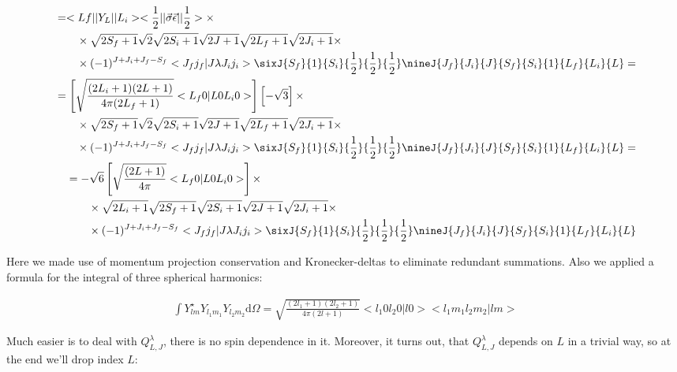 \begin{align}
    \begin{split}
        &= <Lf|| Y_L ||L_i> <\frac{1}{2}|| \vec{\sigma}\vec{\epsilon} ||\frac{1}{2}> \times \\
        &\qquad\times \sqrt{2S_f+1} \sqrt{2} \sqrt{2S_i + 1} \sqrt{2J+1} \sqrt{2L_f+1} \sqrt{2J_i+1} \times \\
        &\qquad\times (-1)^{J + J_i + J_f - S_f} <J_f j_f| J \lambda J_i j_i> \sixJ{S_f}{1}{S_i}{\frac{1}{2}}{\frac{1}{2}}{\frac{1}{2}} \nineJ{J_f}{J_i}{J}{S_f}{S_i}{1}{L_f}{L_i}{L} =
    \end{split}\\
    \begin{split}
        &= \left[ \sqrt{\frac{(2L_i+1)(2L+1)}{4\pi (2L_f+1)}} <L_f 0 | L 0 L_i 0> \right] \left[ -\sqrt{3} \right] \times \\
        &\qquad\times \sqrt{2S_f+1} \sqrt{2} \sqrt{2S_i + 1} \sqrt{2J+1} \sqrt{2L_f+1} \sqrt{2J_i+1} \times \\
        &\qquad\times (-1)^{J + J_i + J_f - S_f} <J_f j_f| J \lambda J_i j_i> \sixJ{S_f}{1}{S_i}{\frac{1}{2}}{\frac{1}{2}}{\frac{1}{2}} \nineJ{J_f}{J_i}{J}{S_f}{S_i}{1}{L_f}{L_i}{L} =
    \end{split}\\
    \begin{split}
        &= -\sqrt{6} \left[ \sqrt{\frac{(2L+1)}{4\pi}} <L_f 0 | L 0 L_i 0> \right] \times \\
        &\qquad\times \sqrt{2L_i+1} \sqrt{2S_f+1} \sqrt{2S_i + 1} \sqrt{2J+1} \sqrt{2J_i+1} \times \\
        &\qquad\times (-1)^{J + J_i + J_f - S_f} <J_f j_f| J \lambda J_i j_i> \sixJ{S_f}{1}{S_i}{\frac{1}{2}}{\frac{1}{2}}{\frac{1}{2}} \nineJ{J_f}{J_i}{J}{S_f}{S_i}{1}{L_f}{L_i}{L}
    \end{split}
\end{align}

Here we made use of momentum projection conservation and Kronecker-deltas to eliminate redundant summations. Also we applied a formula for the integral of three spherical harmonics:

\begin{align}
    \int Y^{\star}_{l m} Y_{l_1 m_1} Y_{l_2 m_2} \mathrm{d} \Omega = \sqrt{\frac{(2l_1+1)(2l_2+1)}{4 \pi (2l+1)}} <l_1 0 l_2 0 | l 0> <l_1 m_1 l_2 m_2 | l m>
\end{align}

Much easier is to deal with $Q_{L, J}^\lambda$, there is no spin dependence in it. Moreover, it turns out, that $Q_{L, J}^{\lambda}$ depends on $L$ in a trivial way, so at the end we'll drop index $L$:

